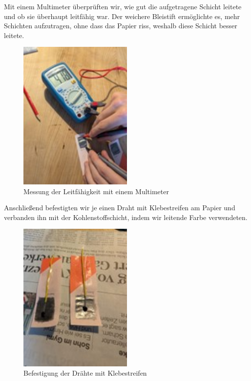 \documentclass[a4paper,12pt]{article}
\begin{document}
\noindent Mit einem Multimeter überprüften wir, wie gut die aufgetragene Schicht leitete und ob sie überhaupt leitfähig war. Der weichere Bleistift ermöglichte es, mehr Schichten aufzutragen, ohne dass das Papier riss, weshalb diese Schicht besser leitete.

\begin{figure}[h!]
\centering
\includegraphics[width=0.5\textwidth]{Bild2} %
\caption{Messung der Leitfähigkeit mit einem Multimeter}
\label{fig:bild2}
\end{figure}

\noindent Anschließend befestigten wir je einen Draht mit Klebestreifen am Papier und verbanden ihn mit der Kohlenstoffschicht, indem wir leitende Farbe verwendeten.

\begin{figure}[h!]
\centering
\includegraphics[width=0.5\textwidth]{Bild3} %
\caption{Befestigung der Drähte mit Klebestreifen}
\label{fig:bild3}
\end{figure}
\end{document}
